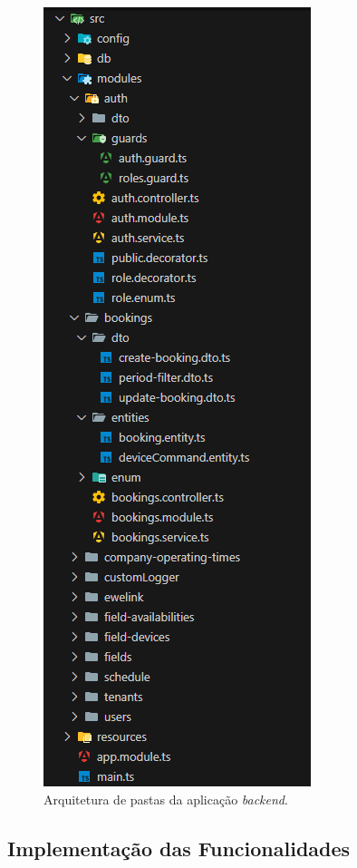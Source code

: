 \begin{figure}[htp]
	\caption{\label{fig:arquitetura_pastas}Arquitetura de pastas da aplicação \textit{backend}.}
	\begin{center}
	  \includegraphics[scale=0.5]{images/cap5/arq_pastas.png}
	\end{center}
\end{figure}

\subsection{Implementação das Funcionalidades}\label{subsec:implementacao_funcionalidades}

